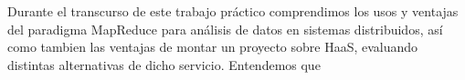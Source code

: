 Durante el transcurso de este trabajo pr\'actico comprendimos los usos y ventajas del paradigma MapReduce para an\'alisis de datos en sistemas distribuidos, 
as\'i como tambien las ventajas de montar un proyecto sobre HaaS, evaluando distintas alternativas de dicho servicio.
Entendemos que 
